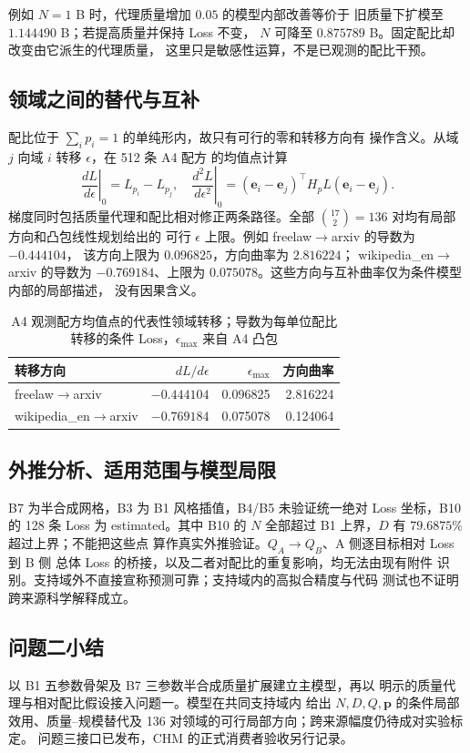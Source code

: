 例如 $N=1$ B 时，代理质量增加 $0.05$ 的模型内部改善等价于
旧质量下扩模至 $1.144490$ B；若提高质量并保持 Loss 不变，
$N$ 可降至 $0.875789$ B。固定配比却改变由它派生的代理质量，
这里只是敏感性运算，不是已观测的配比干预。

\subsection{领域之间的替代与互补}

配比位于 $\sum_i p_i=1$ 的单纯形内，故只有可行的零和转移方向有
操作含义。从域 $j$ 向域 $i$ 转移 $\epsilon$，在 512 条 A4 配方
的均值点计算
\begin{equation}\label{eq:cyj-pair}
\left.\frac{dL}{d\epsilon}\right|_0=L_{p_i}-L_{p_j},\quad
\left.\frac{d^2L}{d\epsilon^2}\right|_0=
(\boldsymbol e_i-\boldsymbol e_j)^\top H_pL
(\boldsymbol e_i-\boldsymbol e_j).
\end{equation}
梯度同时包括质量代理和配比相对修正两条路径。全部
$\binom{17}{2}=136$ 对均有局部方向和凸包线性规划给出的
可行 $\epsilon$ 上限。例如 freelaw$\to$arxiv 的导数为 $-0.444104$，
该方向上限为 $0.096825$，方向曲率为 $2.816224$；
wikipedia\_en$\to$arxiv 的导数为 $-0.769184$、上限为
$0.075078$。这些方向与互补曲率仅为条件模型内部的局部描述，
没有因果含义。

\begin{table}[htbp]
\centering\small
\caption{A4 观测配方均值点的代表性领域转移；导数为每单位配比转移的条件 Loss，$\epsilon_{\max}$ 来自 A4 凸包}
\label{tab:cyj-q2-pairs}
\begin{tabular}{lrrr}
\hline
转移方向 & $dL/d\epsilon$ & $\epsilon_{\max}$ & 方向曲率\\ \hline
freelaw$\to$arxiv & $-0.444104$ & 0.096825 & 2.816224\\
wikipedia\_en$\to$arxiv & $-0.769184$ & 0.075078 & 0.124064\\ \hline
\end{tabular}
\end{table}

\subsection{外推分析、适用范围与模型局限}

B7 为半合成网格，B3 为 B1 风格插值，B4/B5 未验证统一绝对
Loss 坐标，B10 的 128 条 Loss 为 estimated。其中 B10 的 $N$
全部超过 B1 上界，$D$ 有 $79.6875\%$ 超过上界；不能把这些点
算作真实外推验证。$Q_A\to Q_B$、A 侧逐目标相对 Loss 到 B 侧
总体 Loss 的桥接，以及二者对配比的重复影响，均无法由现有附件
识别。支持域外不直接宣称预测可靠；支持域内的高拟合精度与代码
测试也不证明跨来源科学解释成立。

\subsection{问题二小结}

以 B1 五参数骨架及 B7 三参数半合成质量扩展建立主模型，再以
明示的质量代理与相对配比假设接入问题一。模型在共同支持域内
给出 $N,D,Q,\boldsymbol p$ 的条件局部效用、质量--规模替代及
136 对领域的可行局部方向；跨来源幅度仍待成对实验标定。
问题三接口已发布，CHM 的正式消费者验收另行记录。

